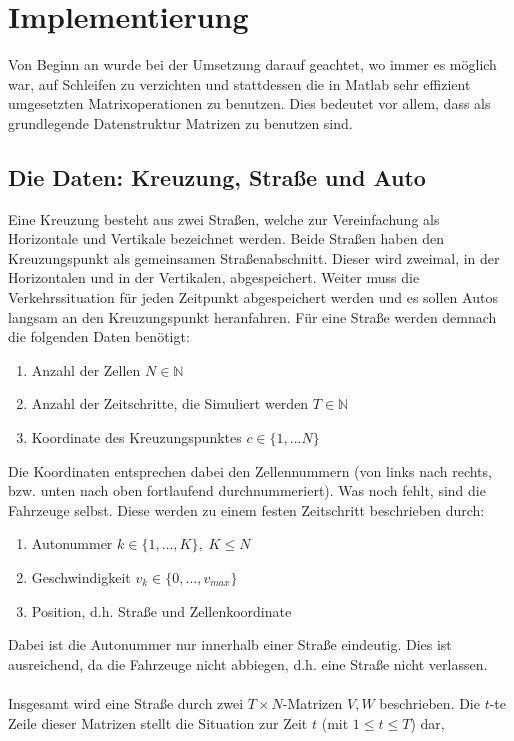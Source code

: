 \section{Implementierung}
Von Beginn an wurde bei der Umsetzung darauf geachtet, wo immer es möglich war, auf Schleifen zu verzichten und stattdessen die in Matlab sehr effizient umgesetzten Matrixoperationen zu benutzen. Dies bedeutet vor allem, dass als grundlegende Datenstruktur Matrizen zu benutzen sind. 

\subsection{Die Daten: Kreuzung, Straße und Auto}
Eine Kreuzung besteht aus zwei Straßen, welche zur Vereinfachung als Horizontale und Vertikale bezeichnet werden. Beide Straßen haben den Kreuzungspunkt als gemeinsamen Straßenabschnitt. Dieser wird zweimal, in der Horizontalen und in der Vertikalen, abgespeichert. 
Weiter muss die Verkehrssituation für jeden Zeitpunkt abgespeichert werden und es sollen Autos langsam an den Kreuzungspunkt heranfahren. 
Für eine Straße werden demnach die folgenden Daten benötigt:
\begin{enumerate}
  \item Anzahl der Zellen \(N \in \mathbb{N}\)
  \item Anzahl der Zeitschritte, die Simuliert werden \(T \in \mathbb{N}\)
  \item Koordinate des Kreuzungspunktes \(c \in \{ 1, \ldots N \}\)
\end{enumerate}
Die Koordinaten entsprechen dabei den Zellennummern (von links nach rechts, bzw. unten nach oben fortlaufend durchnummeriert). 
Was noch fehlt, sind die Fahrzeuge selbst. Diese werden zu einem festen Zeitschritt beschrieben durch:
\begin{enumerate}
  \item Autonummer \(k \in \{ 1, \ldots, K \}, \; K \leq N\) 
  \item Geschwindigkeit \(v_k \in \{0, \ldots, v_{max} \}\)
  \item Position, d.h. Straße und Zellenkoordinate
\end{enumerate}
Dabei ist die Autonummer nur innerhalb einer Straße eindeutig. Dies ist ausreichend, da die Fahrzeuge nicht 
abbiegen, d.h. eine Straße nicht verlassen.
\\ \\
Insgesamt wird eine Straße durch zwei \(T \times N\)-Matrizen \(V, W\) beschrieben.
Die \(t\)-te Zeile dieser Matrizen stellt die Situation zur Zeit \(t\) (mit \(1 \leq t \leq T\)) dar, 
